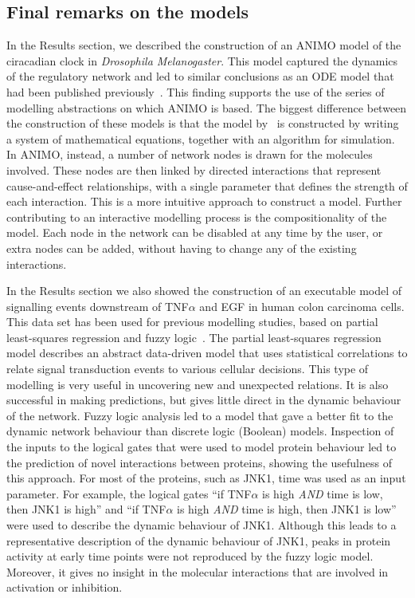 \documentclass{bmcart}
\begin{document}
\subsection*{Final remarks on the models}
In the Results section, we described the construction of an ANIMO
model of the ciracadian clock in \emph{Drosophila Melanogaster}. This model
captured the dynamics of the regulatory network and led to similar 
conclusions as an ODE model that had been
published previously~\cite{drosophila-ode-model}. This finding supports the use of
the series of modelling abstractions on which ANIMO is based. The biggest
difference between the construction of these models is that the model by~\cite{drosophila-ode-model}
is constructed by writing a system of mathematical equations, together
with an algorithm for simulation. In ANIMO, instead, a number of network
nodes is drawn for the molecules involved. 
These nodes are then linked by directed
interactions that represent cause-and-effect relationships, with a single parameter 
that defines the strength of each
interaction. This is a more intuitive approach to construct a model.
Further contributing to an interactive modelling process
is the compositionality of the model. Each node in the network
can be disabled at any time by the user, or extra nodes can be added,
without having to change any of the existing interactions.

In the Results section we also showed the construction of an executable model
of signalling events downstream of
TNF$\alpha$ and EGF in human colon carcinoma cells. This data set has been used for
previous modelling studies, based on partial least-squares regression and fuzzy 
logic~\cite{pathway-leastsquare,pathway-fuzzy}.
The partial least-squares regression model describes an abstract data-driven model 
that uses statistical correlations
to relate signal transduction events to various cellular decisions. This type of modelling is
very useful in uncovering new and unexpected relations. It is also successful in making
predictions, but gives little direct in the dynamic behaviour of the network. Fuzzy
logic analysis led to a model that gave a better fit to the dynamic network behaviour than
discrete logic (Boolean) models. Inspection of the inputs to the logical gates that were used
to model protein behaviour led to the prediction of novel interactions between proteins,
showing the usefulness of this approach. For most of the proteins, such as JNK1, time was
used as an input parameter. For example, the logical gates ``if TNF$\alpha$ is high
\emph{AND} time is low, then JNK1 is high'' and ``if TNF$\alpha$ is high \emph{AND} time is
high, then JNK1 is low'' were used to
describe the dynamic behaviour of JNK1. Although this leads to a representative
description of the dynamic behaviour of JNK1, peaks in protein activity at early time points were
not reproduced by the fuzzy logic model. Moreover, it gives no insight in the molecular interactions 
that are involved in activation or inhibition.
\end{document}
